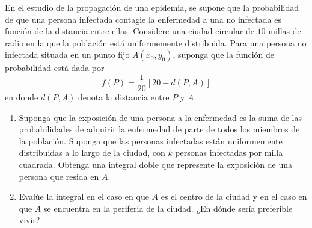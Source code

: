 \item En el estudio de la propagación de una epidemia, se supone que la probabilidad de que una persona infectada contagie la enfermedad a una no infectada es función de la distancia entre ellas. Considere una ciudad circular de $10$ millas de radio en la que la población está uniformemente distribuida. Para una persona no infectada situada en un punto fijo $A(x_0, y_0)$, suponga que la función de probabilidad está dada por
    \[ f(P) = \frac{1}{20}[20 - d(P, A)] \]
    en donde $d(P, A)$ denota la distancia entre $P$ y $A$.
    \begin{enumerate}
        \item[(a)] Suponga que la exposición de una persona a la enfermedad es la suma de las probabilidades de adquirir la enfermedad de parte de todos los miembros de la población. Suponga que las personas infectadas están uniformemente distribuidas a lo largo de la ciudad, con $k$ personas infectadas por milla cuadrada. Obtenga una integral doble que represente la exposición de una persona que resida en $A$.
        \item[(b)] Evalúe la integral en el caso en que $A$ es el centro de la ciudad y en el caso en que $A$ se encuentra en la periferia de la ciudad. ¿En dónde sería preferible vivir?
    \end{enumerate}
